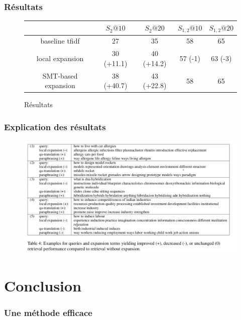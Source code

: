 \documentclass[10pt]{beamer}
\begin{document}
\begin{frame}
  \frametitle{Résultats}
  \begin{figure}[h]
    \centering
    \begin{tabular}[h]{|c|c|c|c|c|}
    \hline
    & $S_2@10$ & $S_2@20$ & $S_{1,2}@10$ & $S_{1,2}@20$\\
    \hline
    baseline tfidf & 27 & 35 & 58 & 65\\
    local expansion & 30 (+11.1) & 40 (+14.2) & 57 (-1) & 63 (-3)\\
    SMT-based expansion & 38 (+40.7) & 43 (+22.8) & 58 & 65\\
    \hline
  \end{tabular}

    \caption{Résultats}
    \label{fig:res}
  \end{figure}

\end{frame}

\begin{frame}
  \frametitle{Explication des résultats}

  \begin{figure}[h]
    \centering
    \includegraphics[width=\textwidth]{table4}
    \label{fig:res}
  \end{figure}
\end{frame}

\section{Conclusion}
\label{sec:conclusion}


\begin{frame}
  \frametitle{Une méthode efficace}
\end{frame}
\end{document}
